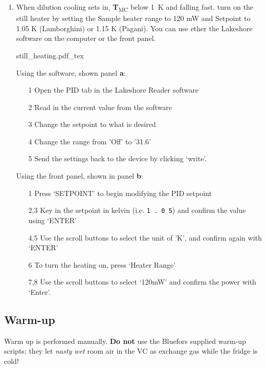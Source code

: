\documentclass{article}[18pt,A4]
\newcommand{\temperature}[1]{{\color{temperaturecolor}\textbf{T}\textsubscript{#1}}}
\begin{document}
\begin{enumerate}
\begin{enumerate}
        \end{enumerate}
    \item When dilution cooling sets in, 
\temperature{MC} below 1~K and falling fast. 
    turn on the still heater by setting the Sample heater range to 120 mW and Setpoint to 1.05 K (Lamborghini) or 1.15 K (Pagani).
    You can use ether the Lakeshore software on the computer or the front panel. 
    
    {
    \centering
    {still_heating.pdf_tex}
    }
    
    Using the software, shown panel \textbf{a}:
    \begin{enumerate}
        \item[1] Open the PID tab in the Lakeshore Reader software
        \item[2] Read in the current value from the software
        \item[3] Change the setpoint to what is desired
        \item[4] Change the range from 'Off' to '31.6'
        \item[5] Send the settings back to the device by clicking `write'.
    \end{enumerate}
    Using the front panel, shown in panel \textbf{b}:
     \begin{enumerate}
        \item[1] Press `SETPOINT' to begin modifying the PID setpoint
        \item[2,3] Key in the setpoint in kelvin (i.e. \texttt{1 . 0 5})
        and confirm the value using `ENTER' 
        \item[4,5] Use the scroll buttons to select the unit of 'K', and confirm again with `ENTER'
        \item[6] To turn the heating on, press `Heater Range' 
        \item[7,8] Use the scroll buttons to select `120mW'
         and confirm the power with `Enter'.
    \end{enumerate}
    
\end{enumerate}


\newpage
\subsection{Warm-up}
Warm up is performed manually. \textbf{Do not} use the Bluefors supplied warm-up scripts; they let \emph{nasty wet} room air in the VC as exchange gas while the fridge is cold!
\end{document}
